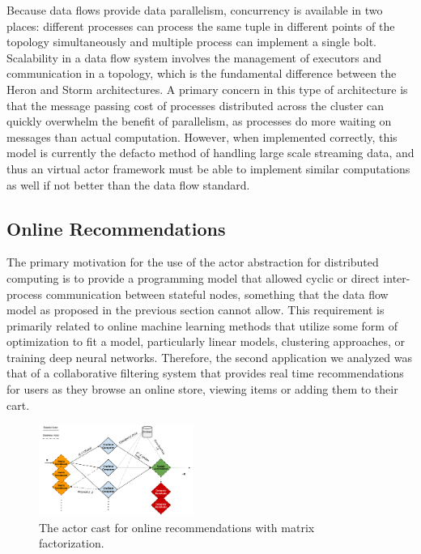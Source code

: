 \documentclass[conference,twocolumn,10pt]{IEEEtran}
\begin{document}
Because data flows provide data parallelism, concurrency is available in two places: different processes can process the same tuple in different points of the topology simultaneously and multiple process can implement a single bolt. Scalability in a data flow system involves the management of executors and communication in a topology, which is the fundamental difference between the Heron and Storm architectures. A primary concern in this type of architecture is that the message passing cost of processes distributed across the cluster can quickly overwhelm the benefit of parallelism, as processes do more waiting on messages than actual computation. However, when implemented correctly, this model is currently the defacto method of handling large scale streaming data, and thus an virtual actor framework must be able to implement similar computations as well if not better than the data flow standard.

\subsection{Online Recommendations}

The primary motivation for the use of the actor abstraction for distributed computing is to provide a programming model that allowed cyclic or direct inter-process communication between stateful nodes, something that the data flow model as proposed in the previous section cannot allow. This requirement is primarily related to online machine learning methods that utilize some form of optimization to fit a model, particularly linear models, clustering approaches, or training deep neural networks. Therefore, the second application we analyzed was that of a collaborative filtering system that provides real time recommendations for users as they browse an online store, viewing items or adding them to their cart.

\begin{figure}[!t]
    \centering
    \includegraphics[width=0.45\textwidth]{nnmf_cast}
    \caption{The actor cast for online recommendations with matrix factorization.}
    \label{fig:nnmf_cast}
\end{figure}
\end{document}
